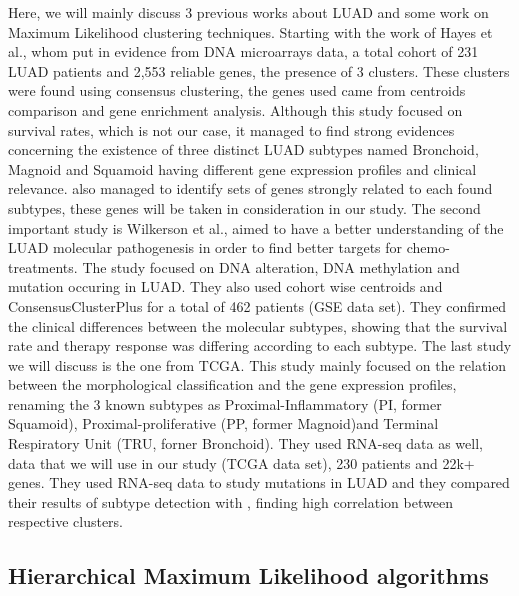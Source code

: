 \documentclass[twocolumn,12pt]{article}
\begin{document}
Here, we will mainly discuss 3 previous works about LUAD and some work on Maximum Likelihood clustering techniques.
Starting with the work of Hayes et al.\cite{hayes}, whom put in evidence from DNA microarrays data, a total cohort of 231 LUAD patients and 2,553 reliable genes, the presence of 3 clusters.
These clusters were found using consensus clustering\cite{cons}, the genes used came from centroids comparison and gene enrichment analysis.
Although this study focused on survival rates, which is not our case, it managed to find strong evidences concerning the existence of three distinct LUAD subtypes named Bronchoid, Magnoid and Squamoid having different gene expression profiles and clinical relevance. \cite{hayes} also managed to identify sets of genes strongly related to each found subtypes, these genes will be taken in consideration in our study.
The second important study is Wilkerson et al.\cite{wilk}, aimed to have a better understanding of the LUAD molecular pathogenesis in order to find better targets for chemo-treatments.
The study focused on DNA alteration, DNA methylation and mutation occuring in LUAD.
They also used cohort wise centroids and ConsensusClusterPlus\cite{consensusPlus} for a total of 462 patients (GSE data set).
They confirmed the clinical differences between the molecular subtypes, showing that the survival rate and therapy response was differing according to each subtype.
The last study we will discuss is the one from TCGA\cite{TCGA}.
This study mainly focused on the relation between the morphological classification and the gene expression profiles, renaming the 3 known subtypes as Proximal-Inflammatory (PI, former Squamoid), Proximal-proliferative (PP, former Magnoid)and Terminal Respiratory Unit (TRU, forner Bronchoid).
They used RNA-seq data as well, data that we will use in our study (TCGA data set), 230 patients and 22k+ genes.
They used RNA-seq data to study mutations in LUAD and they compared their results of subtype detection with \cite{wilk}, finding high correlation between respective clusters.

\subsection{Hierarchical Maximum Likelihood algorithms}
\end{document}
